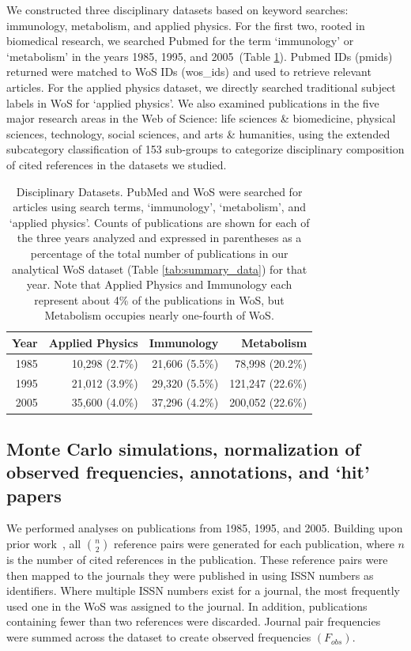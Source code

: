 \documentclass[NETN]{stjour}
\begin{document}
We constructed three disciplinary datasets based on keyword searches: immunology,   metabolism, and   applied physics. For the first two, rooted in biomedical research, we searched Pubmed for the term `immunology' or `metabolism' in the years 1985, 1995, and 2005~(Table \ref{tab:disc-datasets}). Pubmed IDs (pmids) returned were matched to WoS IDs (wos\_ids) and used to retrieve relevant articles. For the applied physics dataset, we directly searched traditional subject labels in WoS for `applied physics'. We also examined publications in the five major research areas in the Web of Science: life sciences \& biomedicine, physical sciences, technology, social sciences, and arts \& humanities,  using the extended subcategory classification of 153 sub-groups to categorize disciplinary composition of cited references in the datasets we studied.
\vspace{-2 mm}
\begin{table}[ht]
\caption{Disciplinary Datasets. PubMed and WoS were searched for articles using search terms, `immunology', `metabolism', and `applied physics'. Counts of publications are shown for each of the three years analyzed and expressed in parentheses as a percentage of the total number of publications in our analytical WoS dataset (Table \ref{tab:summary_data}) for that year. Note that Applied Physics and Immunology each represent about 4\% of the publications in WoS, but Metabolism occupies nearly one-fourth of WoS.}
\label{tab:disc-datasets}
\centering
\begin{tabular}{|r r r r|}
  \hline
Year & Applied Physics & Immunology & Metabolism   \\ 
  \hline
1985 & 10,298 (2.7\%) & 21,606 (5.5\%) & 78,998 (20.2\%)  \\ 
1995 & 21,012 (3.9\%)  & 29,320 (5.5\%)  & 121,247 (22.6\%)   \\ 
2005 & 35,600 (4.0\%) & 37,296 (4.2\%) & 200,052 (22.6\%)    \\ 
 \hline
\end{tabular}
\vspace{-6mm}
\end{table}

\subsection{Monte Carlo simulations, normalization of observed frequencies, annotations, and `hit' papers}

We performed analyses on publications from 1985, 1995, and 2005. Building upon prior work~\citep{uzzi_atypical_2013}, all ${n \choose 2}$ reference pairs were generated for each publication, where $n$ is the number of cited references in the publication. These reference pairs were then mapped to the journals they were published in using ISSN numbers as identifiers. Where multiple ISSN numbers exist for a journal, the most frequently used one in the WoS was assigned to the journal. In addition, publications containing fewer than two references were discarded. Journal pair frequencies were summed across the dataset to create observed frequencies $(F_{obs})$. 
\end{document}
